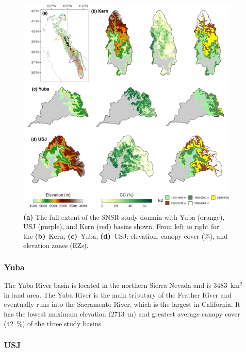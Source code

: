 \begin{figure}[t]
\centering
\includegraphics[width=14cm]{figures/ch2_figs/kuy_study_area_v3.png}
\caption{\textbf{(a)} The full extent of the SNSR study domain with Yuba (orange), USJ (purple), and Kern (red) basins shown. From left to right for the \textbf{(b)}~Kern, \textbf{(c)}~Yuba, \textbf{(d)}~USJ: elevation, canopy cover (\%), and elevation zones (EZs).}
\label{fig:kuy_study_area}
\end{figure}


\hypertarget{ch2-sa-1}{\subsubsection{Yuba}\label{ch2-sa-1}}

The Yuba River basin is located in the northern Sierra Nevada and is 3483~km$^{2}$ in land area. The Yuba River is the main tributary of the Feather River and eventually runs into the Sacramento River, which is the largest in California. It has the lowest maximum elevation (2713~m) and greatest average canopy cover (42~\%) of the three study basins. 

\hypertarget{ch2-sa-2}{\subsubsection{USJ}\label{ch2-sa-2}}

